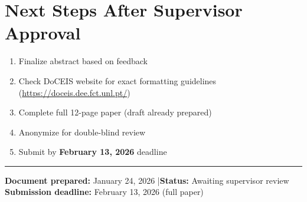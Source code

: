 \documentclass[11pt,a4paper]{article}
\begin{document}
\vspace{15pt}

\section*{Next Steps After Supervisor Approval}

\begin{enumerate}
    \item Finalize abstract based on feedback
    \item Check DoCEIS website for exact formatting guidelines (\url{https://doceis.dee.fct.unl.pt/})
    \item Complete full 12-page paper (draft already prepared)
    \item Anonymize for double-blind review
    \item Submit by \textbf{February 13, 2026} deadline
\end{enumerate}

\vspace{20pt}

\hrule
\vspace{5pt}
\begin{center}
\small
\textbf{Document prepared:} January 24, 2026 \quad|\quad \textbf{Status:} Awaiting supervisor review\\
\textbf{Submission deadline:} February 13, 2026 (full paper)
\end{center}
\end{document}
